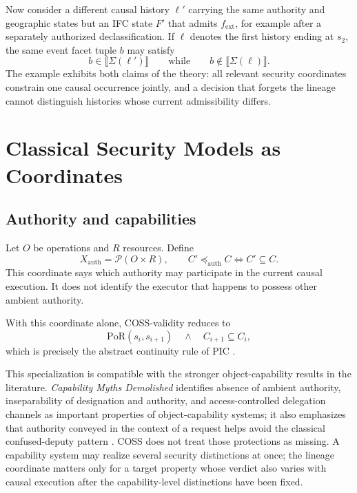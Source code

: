 \documentclass[10pt,twocolumn]{article}
\newcommand{\Model}{\textnormal{\textsc{COSS}}\xspace}
\newcommand{\PoR}{\mathrm{PoR}}
\newcommand{\sem}[1]{\llbracket #1 \rrbracket}
\newcommand{\powerset}{\mathcal{P}}
\newcommand{\state}{\Sigma}
\begin{document}
Now consider a different causal history $\ell'$ carrying the same authority
and geographic states but an IFC state $F'$ that admits $f_{\mathrm{ext}}$,
for example after a separately authorized declassification. If $\ell$ denotes
the first history ending at $s_2$, the same event facet tuple $b$ may satisfy
\begin{equation}
  b\in\sem{\state(\ell')}
  \qquad\text{while}\qquad
  b\notin\sem{\state(\ell)}.
\end{equation}
The example exhibits both claims of the theory: all relevant security
coordinates constrain one causal occurrence jointly, and a decision that
forgets the lineage cannot distinguish histories whose current admissibility
differs.

\section{Classical Security Models as Coordinates}

\subsection{Authority and capabilities}

Let $O$ be operations and $R$ resources.  Define
\begin{equation}
  X_{\mathrm{auth}}=\powerset(O\times R),
  \qquad
  C'\preceq_{\mathrm{auth}}C
  \Longleftrightarrow C'\subseteq C.
\end{equation}
This coordinate says which authority may participate in the current causal
execution.  It does not identify the executor that happens to possess other
ambient authority.

With this coordinate alone, \Model-validity reduces to
\begin{equation}
  \PoR(s_i,s_{i+1})
  \quad\land\quad
  C_{i+1}\subseteq C_i,
\end{equation}
which is precisely the abstract continuity rule of PIC
\cite{gallo_poc2026}.

This specialization is compatible with the stronger object-capability results
in the literature.  \emph{Capability Myths Demolished} identifies absence of
ambient authority, inseparability of designation and authority, and
access-controlled delegation channels as important properties of
object-capability systems; it also emphasizes that authority conveyed in the
context of a request helps avoid the classical confused-deputy pattern
\cite{miller_yee_shapiro2003}.  \Model does not treat those protections as
missing.  A capability system may realize several security distinctions at
once; the lineage coordinate matters only for a target property whose verdict
also varies with causal execution after the capability-level distinctions have
been fixed.
\end{document}
